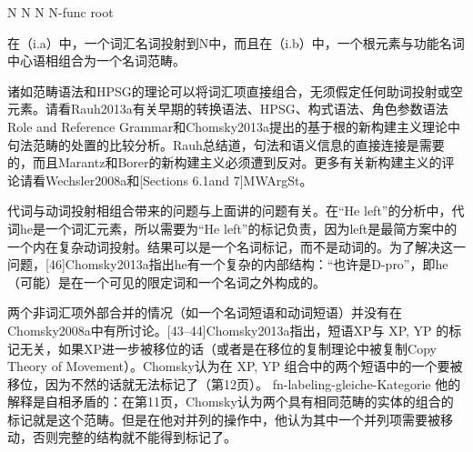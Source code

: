 N  N
N  N-func root 

在（i.a）中，一个词汇名词投射到N中，而且在（i.b）中，一个根元素与功能名词中心语相组合为一个名词范畴。


































诸如范畴语法和HPSG的理论可以将词汇项直接组合，无须假定任何助词投射或空元素。请看Rauh2013a有关早期的转换语法、HPSG、构式语法、角色参数语法Role and Reference Grammar和Chomsky2013a提出的基于根的新构建主义理论中句法范畴的处置的比较分析。Rauh总结道，句法和语义信息的直接连接是需要的，而且Marantz和Borer的新构建主义必须遭到反对。更多有关新构建主义的评论请看Wechsler2008a和[Sections 6.1and 7]MWArgSt。











代词与动词投射相组合带来的问题与上面讲的问题有关。在“He left”的分析中，代词he是一个词汇元素，所以需要为“He left”的标记负责，因为left是最简方案中的一个内在复杂动词投射。结果可以是一个名词标记，而不是动词的。为了解决这一问题，[46]Chomsky2013a指出he有一个复杂的内部结构：“也许是D-pro”，即he（可能）是在一个可见的限定词和一个名词之外构成的。


































两个非词汇项外部合并的情况（如一个名词短语和动词短语）并没有在Chomsky2008a中有所讨论。[43--44]Chomsky2013a指出，短语XP与 XP, YP 的标记无关，如果XP进一步被移位的话（或者是在移位的复制理论中被复制Copy Theory of Movement）。Chomsky认为在 XP, YP 组合中的两个短语中的一个要被移位，因为不然的话就无法标记了（第12页）。 fn-labeling-gleiche-Kategorie
他的解释是自相矛盾的：在第11页，Chomsky认为两个具有相同范畴的实体的组合的标记就是这个范畴。但是在他对并列的操作中，他认为其中一个并列项需要被移动，否则完整的结构就不能得到标记了。

